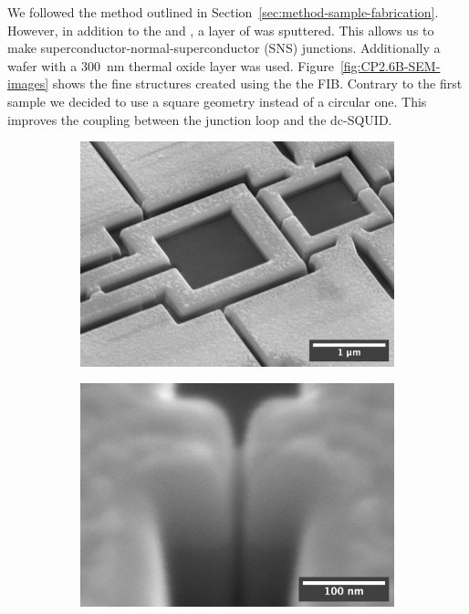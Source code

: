 We followed the method outlined in Section~\ref{sec:method-sample-fabrication}. However, in addition to the  and , a layer of  was sputtered. This allows us to make superconductor-normal-superconductor (SNS) junctions. Additionally a  wafer with a \qty{300}{\nano\meter} thermal oxide layer was used. Figure~\ref{fig:CP2.6B-SEM-images} shows the fine structures created using the the FIB. Contrary to the first sample we decided to use a square geometry instead of a circular one. This improves the coupling between the junction loop and the dc-SQUID.

\begin{figure}[ht!]
	\begin{subfigure}[t]{0.3\textwidth}
		\centering
		\includegraphics[width=\textwidth]{figures/samples/CP2/CP2.6B_SEM_overview.jpg}
	\end{subfigure}
	\hfill
	\begin{subfigure}[t]{0.3\textwidth}
		\centering
		\includegraphics[width=\textwidth]{figures/samples/CP2/CP2.6B_SEM_junction.jpg}

\end{subfigure}
\end{figure}

